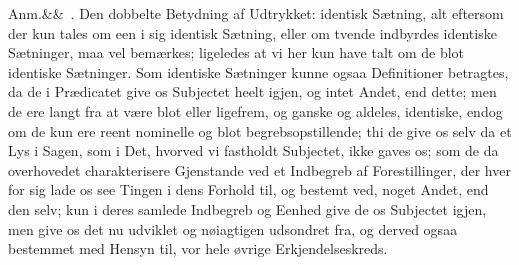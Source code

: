 \documentclass[12pt]{book}
\def\sperr#1{#1}%
\def\textit#1{#1}%
\newcommand{\sperr}[1]{\textls[180]{#1}}
\newcommand{\anm}[1]{%
  \par\vspace{0.5\baselineskip}%
  \noindent\hspace{\parindent}\sperr{Anm.}\ifx&#1&\else~\textit{#1}.\fi
  \enspace\ignorespaces
}
\newcommand{\opage}[1]{\marginnote{\footnotesize\textit{[#1]}}}
\begin{document}

\anm{} Den dobbelte Betydning af Udtrykket: identisk Sætning, alt eftersom der
kun tales om een i sig identisk Sætning, eller om tvende indbyrdes identiske
Sætninger, maa vel
\opage{304} bemærkes; ligeledes at vi her kun have talt om de \sperr{blot} identiske
Sætninger. Som identiske Sætninger kunne ogsaa Definitioner betragtes, da de i
Prædicatet give os Subjectet heelt igjen, og intet Andet, end dette; men de ere
langt fra at være blot eller ligefrem, og ganske og aldeles, identiske, endog om
de kun ere reent nominelle og blot begrebsopstillende; thi de give os selv da et
Lys i Sagen, som i Det, hvorved vi fastholdt Subjectet, ikke gaves os; som de da
overhovedet charakterisere Gjenstande ved et Indbegreb af Forestillinger, der
hver for sig lade os see Tingen i dens Forhold til, og bestemt ved, noget Andet,
end den selv; kun i deres samlede Indbegreb og Eenhed give de os Subjectet igjen,
men give os det nu udviklet og nøiagtigen udsondret fra, og derved ogsaa
bestemmet med Hensyn til, vor hele øvrige Erkjendelseskreds.
\end{document}
